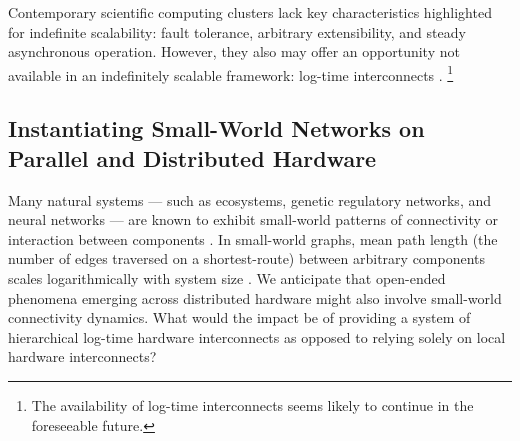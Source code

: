 Contemporary scientific computing clusters lack key characteristics highlighted for indefinite scalability: fault tolerance, arbitrary extensibility, and steady asynchronous operation. %
However, they also may offer an opportunity not available in an indefinitely scalable framework: log-time interconnects \citep{mollah2018comparative}.
\footnote{
The availability of log-time interconnects seems likely to continue in the foreseeable future.
}

\subsection{Instantiating Small-World Networks on Parallel and Distributed Hardware}

Many natural systems --- such as ecosystems, genetic regulatory networks, and neural networks --- are known to exhibit small-world patterns of connectivity or interaction between components \citep{bassett2017small, fox2014herbivores, gaiteri2014beyond}.
In small-world graphs, mean path length (the number of edges traversed on a shortest-route) between arbitrary components scales logarithmically with system size \citep{watts1998collective}.
We anticipate that open-ended phenomena emerging across distributed hardware might also involve small-world connectivity dynamics.
What would the impact be of providing a system of hierarchical log-time hardware interconnects as opposed to relying solely on local hardware interconnects?

